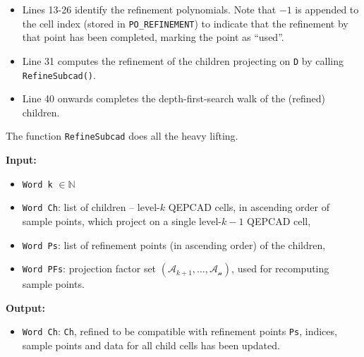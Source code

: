 \documentclass[
]{book}
\providecommand{\tightlist}{%
  \setlength{\itemsep}{0pt}\setlength{\parskip}{0pt}}
\theoremstyle{definition}
\theoremstyle{definition}
\theoremstyle{definition}
\theoremstyle{definition}
\theoremstyle{remark}
\begin{document}
\begin{itemize}
\tightlist
\item
  Lines 13-26 identify the refinement polynomials. Note that \(-1\) is appended to the cell index (stored in \texttt{PO\_REFINEMENT}) to indicate that the refinement by that point has been completed, marking the point as ``used''.
\item
  Line 31 computes the refinement of the children projecting on \texttt{D} by calling \texttt{RefineSubcad()}.
\item
  Line 40 onwards completes the depth-first-search walk of the (refined) children.
\end{itemize}

The function \texttt{RefineSubcad} does all the heavy lifting.

\textbf{Input:}

\begin{itemize}
\tightlist
\item
  \texttt{Word\ k} \(\in \mathbb{N}\)
\item
  \texttt{Word\ Ch}: list of children -- level-\(k\) QEPCAD cells, in ascending order of sample points, which project on a single level-\(k-1\) QEPCAD cell,
\item
  \texttt{Word\ Ps}: list of refinement points (in ascending order) of the children,
\item
  \texttt{Word\ PFs}: projection factor set \((\mathcal{A}_{k+1},\ldots,\mathcal{A_n})\), used for recomputing sample points.
\end{itemize}

\textbf{Output:}

\begin{itemize}
\tightlist
\item
  \texttt{Word\ Ch\textquotesingle{}}: \texttt{Ch}, refined to be compatible with refinement points \texttt{Ps}, indices, sample points and data for all child cells has been updated.
\end{itemize}
\end{document}

